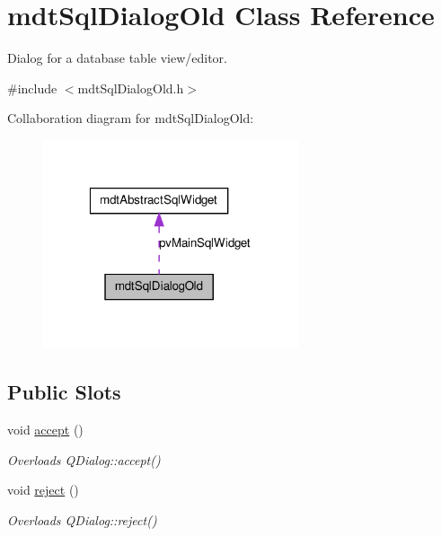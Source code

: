 \hypertarget{classmdt_sql_dialog_old}{
\section{mdtSqlDialogOld Class Reference}
\label{classmdt_sql_dialog_old}
}


Dialog for a database table view/editor.  




{\ttfamily \#include $<$mdtSqlDialogOld.h$>$}



Collaboration diagram for mdtSqlDialogOld:\nopagebreak
\begin{figure}[H]
\begin{center}
\leavevmode
\includegraphics[width=214pt]{classmdt_sql_dialog_old__coll__graph}
\end{center}
\end{figure}
\subsection*{Public Slots}
\begin{DoxyCompactItemize}
\item 
\hypertarget{classmdt_sql_dialog_old_a8fb8b8a8cd090c10c8c7d7f718de6198}{
void \hyperlink{classmdt_sql_dialog_old_a8fb8b8a8cd090c10c8c7d7f718de6198}{accept} ()}
\label{classmdt_sql_dialog_old_a8fb8b8a8cd090c10c8c7d7f718de6198}

\begin{DoxyCompactList}\small\item\em Overloads QDialog::accept() \end{DoxyCompactList}\item 
\hypertarget{classmdt_sql_dialog_old_adb9be20150730eca0a1e14df3ba9f05a}{
void \hyperlink{classmdt_sql_dialog_old_adb9be20150730eca0a1e14df3ba9f05a}{reject} ()}
\label{classmdt_sql_dialog_old_adb9be20150730eca0a1e14df3ba9f05a}

\begin{DoxyCompactList}\small\item\em Overloads QDialog::reject() \end{DoxyCompactList}\end{DoxyCompactItemize}
